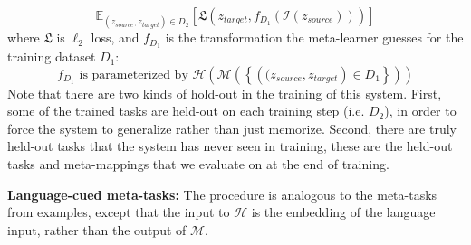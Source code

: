 \documentclass{article}
\begin{document}
\[\mathbb{E}_{(z_{source}, z_{target})\in {D}_2} \left[ \mathfrak{L}\left(z_{target}, f_{D_1}\left(\mathcal{I} \left(z_{source}\right)\right) \right)\right]\]
where $\mathfrak{L}$ is $\ell_2$ loss, and $f_{D_1}$ is the transformation the meta-learner guesses for the training dataset $D_1$:
\[f_{D_1} \text{ is parameterized by } \mathcal{H}\left(\mathcal{M}\left( \left\{\left((z_{source},z_{target}\right) \in D_1 \right\}\right)\right)\]
Note that there are two kinds of hold-out in the training of this system. First, some of the trained tasks are held-out on each training step (i.e. $D_2$), in order to force the system to generalize rather than just memorize. Second, there are truly held-out tasks that the system has never seen in training, these are the held-out tasks and meta-mappings that we evaluate on at the end of training. \par
\textbf{Language-cued meta-tasks:} The procedure is analogous to the meta-tasks from examples, except that the input to $\mathcal{H}$ is the embedding of the language input, rather than the output of $\mathcal{M}$. \par
\end{document}
